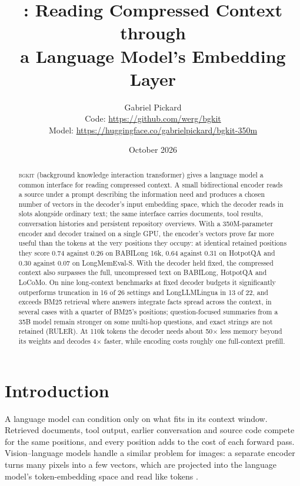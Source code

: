 \documentclass[11pt]{article}
\title{\bgkit: Reading Compressed Context through\\a Language Model's Embedding Layer}
\author{Gabriel Pickard\\[4pt]{\small Code: \url{https://github.com/werg/bgkit}}\\
{\small Model: \url{https://huggingface.co/gabrielpickard/bgkit-350m}}}
\date{October 2026}
\newcommand{\bgkit}{\textsc{bgkit}}
\begin{document}
\maketitle

\begin{abstract}
\bgkit{} (background knowledge interaction transformer) gives a language model a common interface
for reading compressed context. A small
bidirectional encoder reads a source under a prompt describing the information need and produces a
chosen number of vectors in the decoder's input embedding space, which the decoder reads in slots
alongside ordinary text; the same interface carries documents, tool results, conversation histories
and persistent repository overviews. With a 350M-parameter encoder and decoder trained on a single
GPU, the encoder's vectors prove far more useful than the tokens at the very positions they occupy:
at identical retained positions they score 0.74 against 0.26 on BABILong 16k, 0.64 against 0.31 on
HotpotQA and 0.30 against 0.07 on LongMemEval-S. With the decoder held fixed, the compressed context
also surpasses the full, uncompressed text on BABILong, HotpotQA and LoCoMo. On nine long-context
benchmarks at fixed decoder budgets it significantly outperforms truncation in 16 of 26 settings and
LongLLMLingua in 13 of 22, and exceeds BM25 retrieval where answers integrate facts spread across the
context, in several cases with a quarter of BM25's positions; question-focused summaries from a 35B
model remain stronger on some multi-hop questions, and exact strings are not retained (RULER). At
110k tokens the decoder needs about 50$\times$ less memory beyond its weights and decodes 4$\times$
faster, while encoding costs roughly one full-context prefill.
\end{abstract}

\section{Introduction}

A language model can condition only on what fits in its context window. Retrieved documents, tool
output, earlier conversation and source code compete for the same positions, and every position adds
to the cost of each forward pass. Vision--language models handle a similar problem for images: a separate
encoder turns many pixels into a few vectors, which are projected into the language model's
token-embedding space and read like tokens \citep{liu2023llava}.
\end{document}

